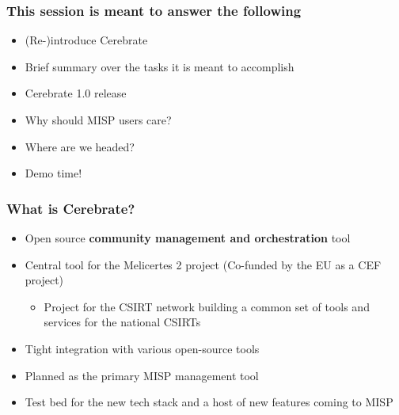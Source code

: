 
\begin{frame}[t,plain]
\titlepage
\end{frame}

\begin{frame}
	\frametitle{This session is meant to answer the following}
	\begin{itemize}
		\item (Re-)introduce Cerebrate
                \item Brief summary over the tasks it is meant to accomplish
                \item Cerebrate 1.0 release
                \item Why should MISP users care?
                \item Where are we headed?
                \item Demo time!
	\end{itemize}
\end{frame}

\begin{frame}
	\frametitle{What is Cerebrate?}
	\begin{itemize}
                \item Open source {\bf community management and orchestration} tool
                \item Central tool for the Melicertes 2 project (Co-funded by the EU as a CEF project)
                \begin{itemize}
                    \item Project for the CSIRT network building a common set of tools and services for the national CSIRTs
                \end{itemize}
                \item Tight integration with various open-source tools
                \item Planned as the primary MISP management tool
                \item Test bed for the new tech stack and a host of new features coming to MISP
	\end{itemize}
\end{frame}

